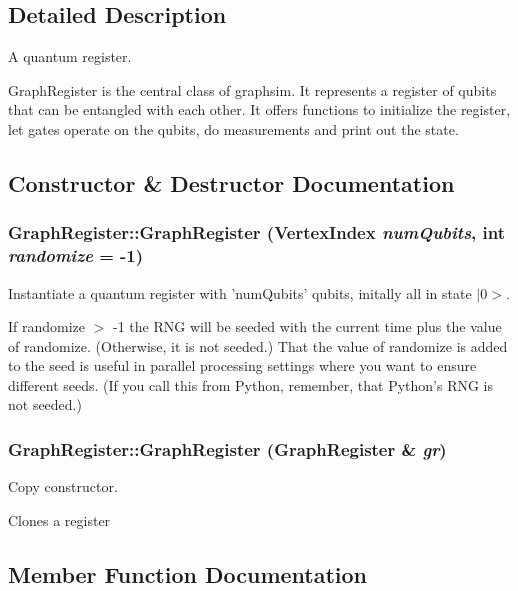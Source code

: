 \subsection{Detailed Description}
A quantum register. 

Graph\-Register is the central class of graphsim. It represents a register of qubits that can be entangled with each other. It offers functions to initialize the register, let gates operate on the qubits, do measurements and print out the state. 



\subsection{Constructor \& Destructor Documentation}
\subsubsection{\setlength{\rightskip}{0pt plus 5cm}Graph\-Register::Graph\-Register ({\bf Vertex\-Index} {\em num\-Qubits}, int {\em randomize} = -1)}\label{classGraphRegister_a0}


Instantiate a quantum register with 'num\-Qubits' qubits, initally all in state $|$0$>$. 

If randomize $>$ -1 the RNG will be seeded with the current time plus the value of randomize. (Otherwise, it is not seeded.) That the value of randomize is added to the seed is useful in parallel processing settings where you want to ensure different seeds. (If you call this from Python, remember, that Python's RNG is not seeded.) 
\subsubsection{\setlength{\rightskip}{0pt plus 5cm}Graph\-Register::Graph\-Register ({\bf Graph\-Register} \& {\em gr})}\label{classGraphRegister_a1}


Copy constructor. 

Clones a register 

\subsection{Member Function Documentation}
